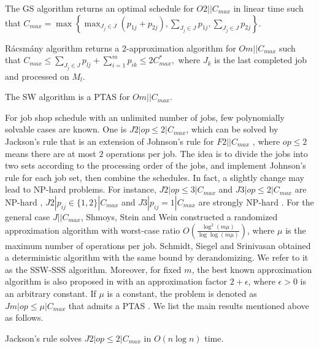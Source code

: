 \documentclass{llncs}
\numberwithin{subcase}{case}
\begin{document}
\begin{theorem}
The GS algorithm returns an optimal schedule for $O2||C_{max}$ in linear time such that
$
C_{max} = \max\left\{\max_{J_j\in J}(p_{1j} + p_{2j}), \sum_{J_j\in J}p_{1j}, \sum_{J_j\in J}p_{2j}\right\}.
$
\label{th_o_gs}
\end{theorem}
\begin{theorem}
R{\'a}csm{\'a}ny algorithm returns a 2-approximation algorithm for $Om||C_{max}$ such that
$
C_{max} \leq \sum_{J_j\in J}p_{lj} + \sum_{i = 1}^m p_{ik} \leq 2C^*_{max},
$
where $J_k$ is the last completed job and processed on $M_l$.\label{th_o_racsmany}
\end{theorem}

\begin{theorem}
The SW algorithm is a PTAS for $Om||C_{max}$.\label{th_o_sw}
\end{theorem}
For job shop schedule with an unlimited number of jobs, few polynomially solvable cases are known. One is $J2|op\leq 2|C_{max}$, which can be solved by Jackson's rule \cite{Jackson56} that is an extension of Johnson's rule for $F2||C_{max}$ \cite{Johnson54}, where $op\leq 2$ means there are at most $2$ operations per job. The idea is to divide the jobs into two sets according to the processing order of the jobs, and implement Johnson's rule for each job set, then combine the schedules. In fact, a slightly change may lead to $\mathrm{NP}$-hard problems. For instance, $J2|op\leq 3|C_{max}$ and $J3|op\leq 2|C_{max}$ are $\mathrm{NP}$-hard \cite{Lenstra1977}, $J2|p_{ij}\in\{1,2\}|C_{max}$ and $J3|p_{ij}=1|C_{max}$ are strongly $\mathrm{NP}$-hard \cite{Lenstra1979}. For the general case $J||C_{max}$, Shmoys, Stein and Wein \cite{Shmoys1994} constructed a randomized approximation algorithm with worst-case ratio $O\left(\frac{\log^2(m\mu)}{\log{\log(m\mu)}}\right)$, where $\mu$ is the maximum number of operations per job. Schmidt, Siegel and Srinivasan \cite{Schmidt1995} obtained a deterministic algorithm with the same bound by derandomizing. We refer to it as the SSW-SSS algorithm. Moreover, for fixed $m$, the best known approximation algorithm is also proposed in \cite{Shmoys1994} with an approximation factor $2 + \epsilon$, where $\epsilon > 0$ is an arbitrary constant. If $\mu$ is a constant, the problem is denoted as $Jm|op\leq \mu|C_{max}$ that admits a PTAS \cite{Jansen2003}. We list the main results mentioned above as follows.

\begin{theorem}
Jackson's rule solves $J2|op\leq 2|C_{max}$ in $O(n\log n)$ time. \label{th_j_jackson}
\end{theorem}
\end{document}
